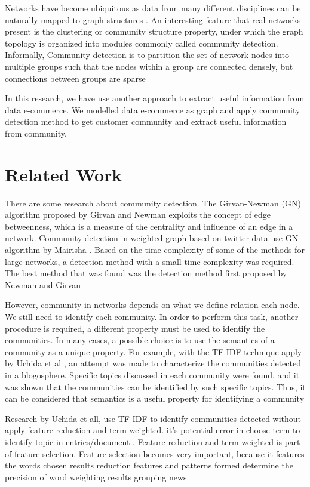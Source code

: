 \documentclass[conference]{IEEEtran}
\begin{document}
Networks have become ubiquitous as data from many different disciplines can be naturally mapped to graph structures \cite{Malliaros}. An interesting feature that real networks present is the clustering or community structure property, under which the graph topology is organized into modules commonly called community detection. Informally, Community detection is to partition the set of network nodes into multiple groups such that the nodes within a group are connected densely, but connections between groups are sparse \cite{Malliaros}

In this research, we have use another approach to extract useful information from data e-commerce. We modelled data e-commerce as graph and apply community detection method to get customer community and extract useful information from community.



\section{Related Work}
There are some research about community detection. The Girvan-Newman (GN) algorithm proposed by Girvan and Newman \cite{Newman} exploits the concept of edge betweenness, which is a measure of the centrality and influence of an edge in a network. Community detection in weighted graph based on twitter data use GN algorithm by Mairisha \cite{Mairisha}. Based on the time complexity of some of the methods for large networks, a detection method with a small time complexity was required. The best method that was found was the detection method first proposed by Newman and Girvan \cite{Kameyama}

However, community in networks depends on what we define relation each node. We still need to identify each community. In order to perform this task, another procedure is required, a different property must be used to identify the communities. In many cases, a possible choice is to use the semantics of a community as a unique property. For example, with the TF-IDF technique apply by Uchida et al \cite{Uchida}, an attempt was made to characterize the communities detected in a blogosphere. Specific topics discussed in each community were found, and it was shown that the communities can be identified by such specific topics. Thus, it can be considered that semantics is a useful property for identifying a community

Research by Uchida et all, use TF-IDF to identify communities detected without apply feature reduction and term weighted. it's potential error in choose term to identify topic in entries/document \cite{Dai}. Feature reduction and term weighted is part of feature selection. Feature selection becomes very important, because it features the words chosen results reduction features and patterns formed determine the precision of word weighting results grouping news \cite{Dai,DaiX}
\end{document}
